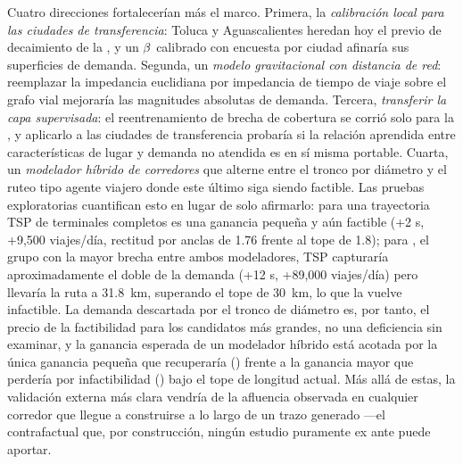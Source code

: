 Cuatro direcciones fortalecerían más el marco. Primera, la \emph{calibración local para las
ciudades de transferencia}: Toluca y Aguascalientes heredan hoy el previo de decaimiento de
la \zmg, y un $\beta$ calibrado con encuesta por ciudad afinaría sus superficies de
demanda. Segunda, un \emph{modelo gravitacional con distancia de red}: reemplazar la
impedancia euclidiana por impedancia de tiempo de viaje sobre el grafo vial mejoraría las
magnitudes absolutas de demanda. Tercera, \emph{transferir la capa supervisada}: el
reentrenamiento de brecha de cobertura se corrió solo para la \zmg, y aplicarlo a las
ciudades de transferencia probaría si la relación aprendida entre características de lugar y
demanda no atendida es en sí misma portable. Cuarta, un \emph{modelador híbrido de
corredores} que alterne entre el tronco por diámetro y el ruteo tipo agente viajero donde
este último siga siendo factible. Las pruebas exploratorias cuantifican esto en lugar de
solo afirmarlo: para  una trayectoria TSP de terminales completos es una
ganancia pequeña y aún factible (+2 \ageb{}s, +9{,}500 viajes/día, rectitud por anclas de
1.76 frente al tope de 1.8); para , el grupo con la mayor brecha entre
ambos modeladores, TSP capturaría aproximadamente el doble de la demanda (+12 \ageb{}s,
+89{,}000 viajes/día) pero llevaría la ruta a 31.8~km, superando el tope de 30~km, lo
que la vuelve infactible. La demanda descartada por el tronco de diámetro es, por tanto,
el precio de la factibilidad para los candidatos más grandes, no una deficiencia sin
examinar, y la ganancia esperada de un modelador híbrido está acotada por la única
ganancia pequeña que recuperaría () frente a la ganancia mayor que
perdería por infactibilidad () bajo el tope de longitud actual. Más allá
de estas, la validación
externa más clara vendría de la afluencia observada en cualquier corredor que llegue a
construirse a lo largo de un trazo generado ---el contrafactual que, por construcción,
ningún estudio puramente ex ante puede aportar.
